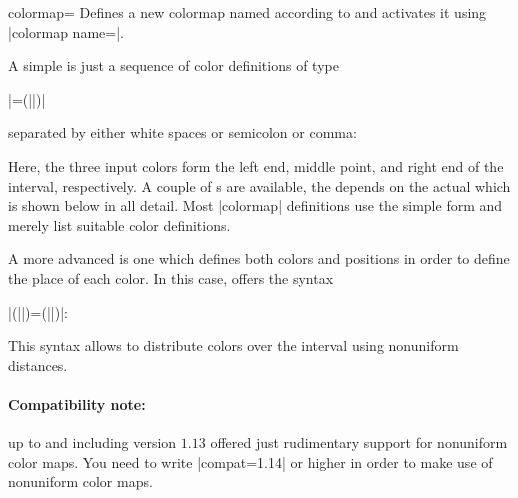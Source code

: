 \begin{pgfplotskey}{colormap=}
    Defines a new colormap named  according to  and activates it using |colormap name=|.

    A simple  is just a sequence of color definitions
    of type

    |=(||)|

    separated by either white spaces or semicolon or comma:
\begin{codeexample}
\end{codeexample}

    Here, the three input colors form the left end, middle point, and right end
    of the interval, respectively. A couple of s are
    available, the  depends on the actual 
    which is shown below in all detail. Most |colormap| definitions use the
    simple form and merely list suitable color definitions.

    A more advanced  is one which defines both colors
    and positions in order to define the place of each color. In this case,
    \PGFPlots{} offers the syntax

    |(||)=(||)|:

\begin{codeexample}
\end{codeexample}

    This syntax allows to distribute colors over the interval using nonuniform
    distances.


    \paragraph{Compatibility note:}

    \PGFPlots{} up to and including version $1.13$ offered just rudimentary
    support for nonuniform color maps. You need to write |compat=1.14| or
    higher in order to make use of nonuniform color maps.%


\end{pgfplotskey}

